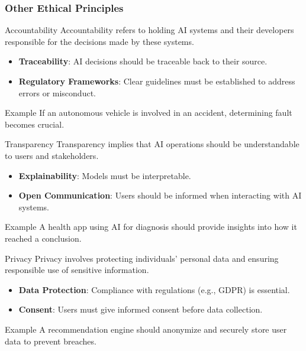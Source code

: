 \documentclass{beamer}
\begin{document}
\begin{frame}[fragile]
    \frametitle{Other Ethical Principles}
    \begin{block}{Accountability}
        Accountability refers to holding AI systems and their developers responsible for the decisions made by these systems.
        \begin{itemize}
            \item \textbf{Traceability}: AI decisions should be traceable back to their source.
            \item \textbf{Regulatory Frameworks}: Clear guidelines must be established to address errors or misconduct.
        \end{itemize}
        \begin{block}{Example}
            If an autonomous vehicle is involved in an accident, determining fault becomes crucial.
        \end{block}
    \end{block}
    
    \begin{block}{Transparency}
        Transparency implies that AI operations should be understandable to users and stakeholders.
        \begin{itemize}
            \item \textbf{Explainability}: Models must be interpretable.
            \item \textbf{Open Communication}: Users should be informed when interacting with AI systems.
        \end{itemize}
        \begin{block}{Example}
            A health app using AI for diagnosis should provide insights into how it reached a conclusion.
        \end{block}
    \end{block}

    \begin{block}{Privacy}
        Privacy involves protecting individuals' personal data and ensuring responsible use of sensitive information.
        \begin{itemize}
            \item \textbf{Data Protection}: Compliance with regulations (e.g., GDPR) is essential.
            \item \textbf{Consent}: Users must give informed consent before data collection.
        \end{itemize}
        \begin{block}{Example}
            A recommendation engine should anonymize and securely store user data to prevent breaches.
        \end{block}
    \end{block}
\end{frame}
\end{document}
